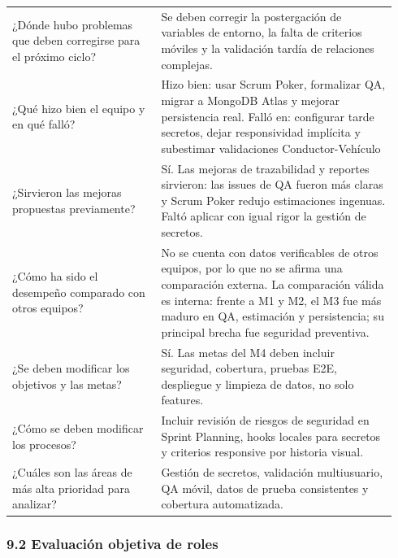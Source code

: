 \documentclass[11pt,a4paper]{article}
\begin{document}
\begin{longtable}{P{0.36\linewidth}P{0.58\linewidth}}
¿Dónde hubo problemas que deben corregirse para el próximo ciclo? & Se deben corregir la postergación de variables de entorno, la falta de criterios móviles y la validación tardía de relaciones complejas. \\
¿Qué hizo bien el equipo y en qué falló? & Hizo bien: usar Scrum Poker, formalizar QA, migrar a MongoDB Atlas y mejorar persistencia real. Falló en: configurar tarde secretos, dejar responsividad implícita y subestimar validaciones Conductor-Vehículo \\
¿Sirvieron las mejoras propuestas previamente? & Sí. Las mejoras de trazabilidad y reportes sirvieron: las issues de QA fueron más claras y Scrum Poker redujo estimaciones ingenuas. Faltó aplicar con igual rigor la gestión de secretos. \\
¿Cómo ha sido el desempeño comparado con otros equipos? & No se cuenta con datos verificables de otros equipos, por lo que no se afirma una comparación externa. La comparación válida es interna: frente a M1 y M2, el M3 fue más maduro en QA, estimación y persistencia; su principal brecha fue seguridad preventiva. \\
¿Se deben modificar los objetivos y las metas? & Sí. Las metas del M4 deben incluir seguridad, cobertura, pruebas E2E, despliegue y limpieza de datos, no solo features. \\
¿Cómo se deben modificar los procesos? & Incluir revisión de riesgos de seguridad en Sprint Planning, hooks locales para secretos y criterios responsive por historia visual. \\
¿Cuáles son las áreas de más alta prioridad para analizar? & Gestión de secretos, validación multiusuario, QA móvil, datos de prueba consistentes y cobertura automatizada. \\
\end{longtable}
\endgroup

\subsubsection{9.2 Evaluación objetiva de roles}
\end{document}

